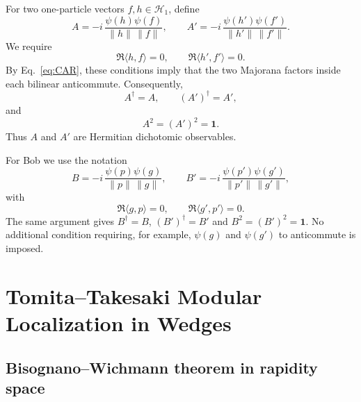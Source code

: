 \documentclass[11pt]{article}
\begin{document}
For two one-particle vectors $f,h\in\mathcal H_1$, define
\begin{equation}
 A=-i\,\frac{\psi(h)\psi(f)}{\|h\|\,\|f\|},
 \qquad
 A'=-i\,\frac{\psi(h')\psi(f')}{\|h'\|\,\|f'\|}.
 \label{eq:Alice}
\end{equation}
We require
\begin{equation}
 \Re\langle h,f\rangle=0,
 \qquad
 \Re\langle h',f'\rangle=0.
 \label{eq:Aliceorth}
\end{equation}
By Eq.~\eqref{eq:CAR}, these conditions imply that the two Majorana factors inside each bilinear anticommute. Consequently,
\begin{equation}
 A^\dagger=A,
 \qquad
 (A')^\dagger=A',
\end{equation}
and
\begin{equation}
 A^2=(A')^2=\mathbf 1.
 \label{eq:Adichotomic}
\end{equation}
Thus $A$ and $A'$ are Hermitian dichotomic observables.

For Bob we use the notation
\begin{equation}
 B=-i\,\frac{\psi(p)\psi(g)}{\|p\|\,\|g\|},
 \qquad
 B'=-i\,\frac{\psi(p')\psi(g')}{\|p'\|\,\|g'\|},
 \label{eq:Bob}
\end{equation}
with
\begin{equation}
 \Re\langle g,p\rangle=0,
 \qquad
 \Re\langle g',p'\rangle=0.
 \label{eq:Boborth}
\end{equation}
The same argument gives $B^\dagger=B$, $(B')^\dagger=B'$ and $B^2=(B')^2=\mathbf1$. No additional condition requiring, for example, $\psi(g)$ and $\psi(g')$ to anticommute is imposed.

\section{Tomita--Takesaki Modular Localization in Wedges}
\label{sec:modular}

\subsection{Bisognano--Wichmann theorem in rapidity space}
\end{document}
